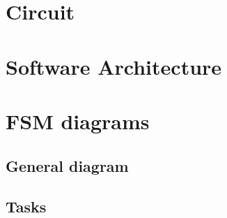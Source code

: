 \section{Circuit}
\section{Software Architecture}
\lipsum[1]

\section{FSM diagrams}
\subsection{General diagram}
\subsection{Tasks}
\lipsum[3]

